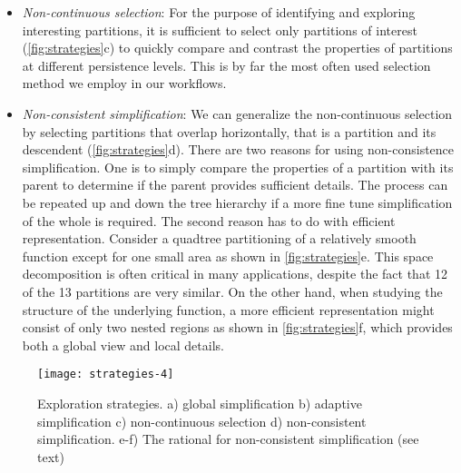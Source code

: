 \begin{itemize}[label={}, leftmargin=0pt, noitemsep]
    \item  \textit{Non-continuous selection}: For the purpose of identifying and exploring interesting partitions, it is sufficient to select only partitions of interest (\autoref{fig:strategies}c) to quickly compare and contrast the properties of partitions at different persistence levels. This is by far the most often used selection method we employ in our workflows.
    
    \item \textit{Non-consistent simplification}: We can generalize the non-continuous selection by selecting partitions that overlap horizontally, that is a partition and its descendent (\autoref{fig:strategies}d). There are two reasons for using  non-consistence simplification. One is to simply compare the properties of a partition with its parent to determine if the parent provides sufficient details. The process can be repeated up and down the tree hierarchy if a more fine tune simplification of the whole \MSC is required. The second reason has to do with efficient representation. Consider a quadtree partitioning of a relatively smooth function except for one small area as shown in \autoref{fig:strategies}e. This space decomposition is often critical in many applications, despite the fact that 12 of the 13 partitions are very similar. On the other hand, when studying the structure of the underlying function, a more efficient representation might consist of only two nested regions as shown in \autoref{fig:strategies}f, which provides both a global view and local details.
\end{itemize}

\begin{figure}[tb]
    \begin{center}
    \texttt{[image: strategies-4]}
    \caption{Exploration strategies. a) global simplification b) adaptive simplification c) non-continuous selection d) non-consistent simplification. e-f) The rational for non-consistent simplification (see text)}
    \label{fig:strategies}
    \end{center}
\end{figure}

 